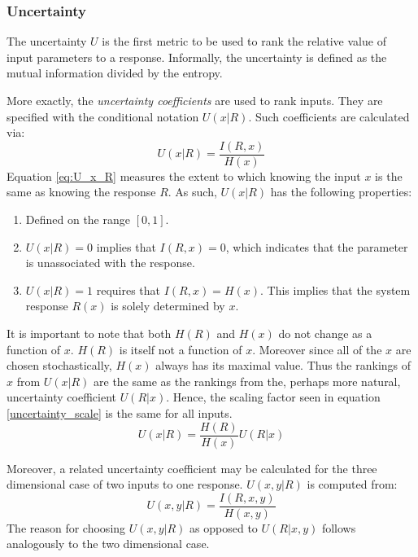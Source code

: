 \subsubsection{Uncertainty}
\label{cts_sec:uncertainty}

The uncertainty $U$ is the first metric to be used to rank the relative value of input 
parameters to a response.  Informally, the uncertainty is defined
as the mutual information divided by the entropy.

More exactly, the \emph{uncertainty coefficients} are used to rank inputs.  They are 
specified with the conditional notation $U(x|R)$.  Such coefficients are calculated via:
\begin{equation}
U(x|R) = \frac{I(R,x)}{H(x)}
\label{eq:U_x_R}
\end{equation}
Equation \ref{eq:U_x_R} measures the extent to which knowing the input $x$ 
is the same as knowing the response $R$.  As such, $U(x|R)$ has the following properties:
\begin{enumerate}
    \item Defined on the range $[0, 1]$.
    \item $U(x|R) = 0$ implies that $I(R,x) = 0$, which indicates that the parameter
        is unassociated with the response.
    \item $U(x|R) = 1$ requires that $I(R,x) = H(x)$.  This implies that
        the system response $R(x)$ is solely determined by $x$.
\end{enumerate}

It is important to note that both $H(R)$ and $H(x)$ do not change as a function of $x$.  
$H(R)$ is itself not a function of $x$.  Moreover since all of the $x$ are chosen stochastically,
$H(x)$ always has its maximal value.  Thus the 
rankings of $x$ from $U(x|R)$ are the same as the rankings from the, perhaps more natural, 
uncertainty coefficient $U(R|x)$.  Hence, the scaling factor seen in equation 
\ref{uncertainty_scale} is the same for all inputs.
\begin{equation}
U(x|R) = \frac{H(R)}{H(x)} U(R|x)
\label{uncertainty_scale}
\end{equation}

Moreover, a related uncertainty coefficient may be calculated for the three dimensional 
case of two inputs to one
response.  $U(x,y|R)$ is computed from:
\begin{equation} U(x,y|R) = \frac{I(R,x,y)}{H(x,y)} \end{equation}
The reason for choosing $U(x,y|R)$ as opposed to $U(R|x,y)$ follows analogously to the 
two dimensional case.

